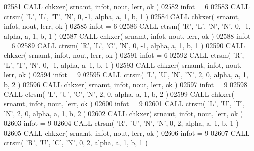 \begin{DoxyCode}
02581       \textcolor{keyword}{CALL }chkxer( srnamt, infot, nout, lerr, ok )
02582       infot = 6
02583       \textcolor{keyword}{CALL }ctrsm( \textcolor{stringliteral}{'L'}, \textcolor{stringliteral}{'L'}, \textcolor{stringliteral}{'T'}, \textcolor{stringliteral}{'N'}, 0, -1, alpha, a, 1, b, 1 )
02584       \textcolor{keyword}{CALL }chkxer( srnamt, infot, nout, lerr, ok )
02585       infot = 6
02586       \textcolor{keyword}{CALL }ctrsm( \textcolor{stringliteral}{'R'}, \textcolor{stringliteral}{'L'}, \textcolor{stringliteral}{'N'}, \textcolor{stringliteral}{'N'}, 0, -1, alpha, a, 1, b, 1 )
02587       \textcolor{keyword}{CALL }chkxer( srnamt, infot, nout, lerr, ok )
02588       infot = 6
02589       \textcolor{keyword}{CALL }ctrsm( \textcolor{stringliteral}{'R'}, \textcolor{stringliteral}{'L'}, \textcolor{stringliteral}{'C'}, \textcolor{stringliteral}{'N'}, 0, -1, alpha, a, 1, b, 1 )
02590       \textcolor{keyword}{CALL }chkxer( srnamt, infot, nout, lerr, ok )
02591       infot = 6
02592       \textcolor{keyword}{CALL }ctrsm( \textcolor{stringliteral}{'R'}, \textcolor{stringliteral}{'L'}, \textcolor{stringliteral}{'T'}, \textcolor{stringliteral}{'N'}, 0, -1, alpha, a, 1, b, 1 )
02593       \textcolor{keyword}{CALL }chkxer( srnamt, infot, nout, lerr, ok )
02594       infot = 9
02595       \textcolor{keyword}{CALL }ctrsm( \textcolor{stringliteral}{'L'}, \textcolor{stringliteral}{'U'}, \textcolor{stringliteral}{'N'}, \textcolor{stringliteral}{'N'}, 2, 0, alpha, a, 1, b, 2 )
02596       \textcolor{keyword}{CALL }chkxer( srnamt, infot, nout, lerr, ok )
02597       infot = 9
02598       \textcolor{keyword}{CALL }ctrsm( \textcolor{stringliteral}{'L'}, \textcolor{stringliteral}{'U'}, \textcolor{stringliteral}{'C'}, \textcolor{stringliteral}{'N'}, 2, 0, alpha, a, 1, b, 2 )
02599       \textcolor{keyword}{CALL }chkxer( srnamt, infot, nout, lerr, ok )
02600       infot = 9
02601       \textcolor{keyword}{CALL }ctrsm( \textcolor{stringliteral}{'L'}, \textcolor{stringliteral}{'U'}, \textcolor{stringliteral}{'T'}, \textcolor{stringliteral}{'N'}, 2, 0, alpha, a, 1, b, 2 )
02602       \textcolor{keyword}{CALL }chkxer( srnamt, infot, nout, lerr, ok )
02603       infot = 9
02604       \textcolor{keyword}{CALL }ctrsm( \textcolor{stringliteral}{'R'}, \textcolor{stringliteral}{'U'}, \textcolor{stringliteral}{'N'}, \textcolor{stringliteral}{'N'}, 0, 2, alpha, a, 1, b, 1 )
02605       \textcolor{keyword}{CALL }chkxer( srnamt, infot, nout, lerr, ok )
02606       infot = 9
02607       \textcolor{keyword}{CALL }ctrsm( \textcolor{stringliteral}{'R'}, \textcolor{stringliteral}{'U'}, \textcolor{stringliteral}{'C'}, \textcolor{stringliteral}{'N'}, 0, 2, alpha, a, 1, b, 1 )

\end{DoxyCode}
